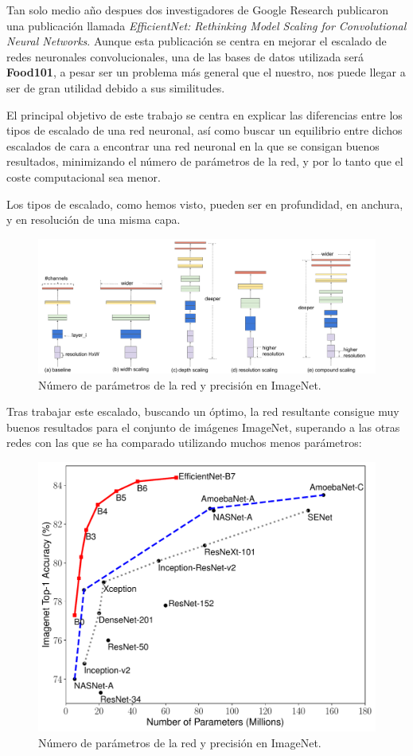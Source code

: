 \newpage

Tan solo medio año despues dos investigadores de Google Research publicaron una publicación llamada \textit{EfficientNet: Rethinking Model Scaling for Convolutional Neural Networks}\cite{efficient}. Aunque esta publicación se centra en mejorar el escalado de redes neuronales convolucionales, una de las bases de datos utilizada será \textbf{Food101}, a pesar ser un problema más general que el nuestro, nos puede llegar a ser de gran utilidad debido a sus similitudes.

El principal objetivo de este trabajo se centra en explicar las diferencias entre los tipos de escalado de una red neuronal, así como buscar un equilibrio entre dichos escalados de cara a encontrar una red neuronal en la que se consigan buenos resultados, minimizando el número de parámetros de la red, y por lo tanto que el coste computacional sea menor.

Los tipos de escalado, como hemos visto, pueden ser en profundidad, en anchura, y en resolución de una misma capa.


\begin{figure}[H]
  \centering
  \includegraphics[width=1\linewidth]{Imagenes/scalecompare.pdf}
  \caption{Número de parámetros de la red y precisión en ImageNet.}
  \label{fig:param-precision}
\end{figure}


Tras trabajar este escalado, buscando un óptimo, la red resultante consigue muy buenos resultados para el conjunto de imágenes ImageNet, superando a las otras redes con las que se ha comparado utilizando muchos menos parámetros:

\begin{figure}[H]
  \centering
  \includegraphics[width=0.5\linewidth]{Imagenes/params.pdf}
  \caption{Número de parámetros de la red y precisión en ImageNet.}
  \label{fig:param-precision}
\end{figure}

